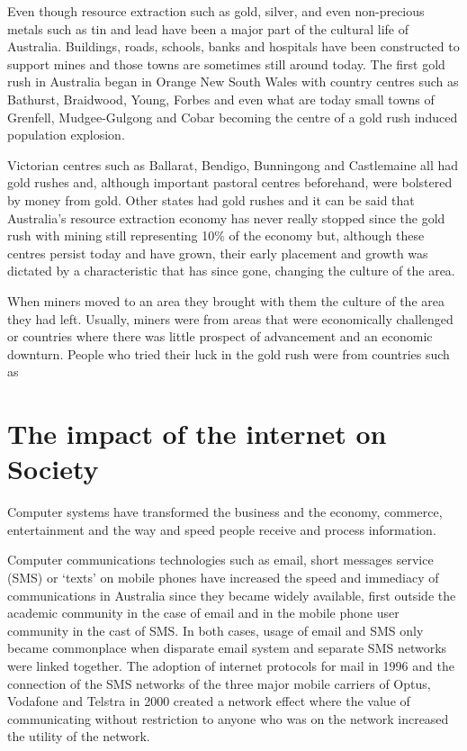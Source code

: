Even though resource extraction such as gold, silver, and even non-precious metals such as tin and lead have been a major part of the cultural life of Australia. Buildings, roads, schools, banks and hospitals have been constructed to support mines and those towns are sometimes still around today. The first gold rush in Australia began in Orange New South Wales with country centres such as Bathurst, Braidwood, Young, Forbes and even what are today small towns of Grenfell, Mudgee-Gulgong and Cobar becoming the centre of a gold rush induced population explosion\cite{RefWorks:433}.

Victorian centres such as Ballarat, Bendigo, Bunningong and Castlemaine all had gold rushes and, although important pastoral centres beforehand, were bolstered by money from gold. Other states had gold rushes and it can be said that Australia's resource extraction economy has never really stopped since the gold rush with mining still representing 10\% of the economy %
but, although these centres persist today and have grown, their early placement and growth was dictated by a characteristic that has since gone, changing the culture of the area.

When miners moved to an area they brought with them the culture of the area they had left. Usually, miners were from areas that were economically challenged or countries where there was little prospect of advancement and an economic downturn. People who tried their luck in the gold rush were from countries such as 




\section{The impact of the internet on Society}
Computer systems have transformed the business and the economy, commerce, entertainment and the way and speed people receive and process information.

Computer communications technologies such as email, short messages service (SMS) or `texts' on mobile phones have increased the speed and immediacy of communications in Australia since they became widely available, first outside the academic community in the case of email and in the mobile phone user community in the cast of SMS. In both cases, usage of email and SMS only became commonplace when disparate email system and separate SMS networks were linked together. The adoption of internet protocols for mail in 1996 and the connection of the SMS networks of the three major mobile carriers of Optus, Vodafone and Telstra in 2000 created a network effect where the value of communicating without restriction to anyone who was on the network increased the utility of the network\cite{RefWorks:435}.

